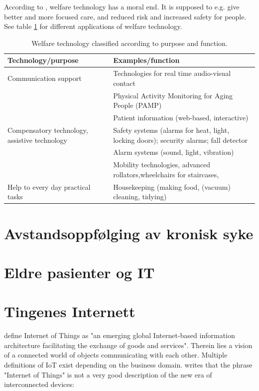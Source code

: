 According to \citet{welfare_ethical}, welfare technology has a moral end. It is supposed to
e.g. give better and more focused care, and reduced risk and increased safety for people. See table
\ref{table:welfare_definition} for different applications of welfare technology. 


\begin{table}[!ht]
\setlength\extrarowheight{2pt} %
\centering
\begin{tabularx}{\textwidth}{|X|X|}
\hline
\textbf{Technology/purpose} & \textbf{Examples/function} \\ \hline
Communication support & Technologies for real time audio-visual contact \\ \hline
 & Physical Activity Monitoring for Aging People (PAMP) \\ \hline
 & Patient information (web-based, interactive) \\ \hline
Compensatory technology, assistive technology & Safety systems (alarms for heat, light, locking doors);
  security alarms; fall detector \\ \hline
  & Alarm systems (sound, light, vibration) \\ \hline
  & Mobility technologies, advanced rollators,wheelchairs for staircases, \\ \hline
Help to every day practical tasks & Housekeeping (making food, (vacuum) cleaning, tidying) \\ \hline

\end{tabularx}
\caption{Welfare technology classified according to purpose and function. \citep{welfare_ethical}}
\label{table:welfare_definition}
\end{table}


\section{Avstandsoppfølging av kronisk syke}
\blindtext

\section{Eldre pasienter og IT}
\blindtext

\section{Tingenes Internett}
\citet{iot_legal} define Internet of Things as "an emerging global
Internet-based information architecture facilitating the exchange of
goods and services". Therein lies a vision of a connected world of objects
communicating with each other. Multiple definitions of IoT exist depending on the business domain.
\citet{iot_harvard_smart} writes that the phrase "Internet of Things" is not a very good description
of the new era of interconnected devices:

